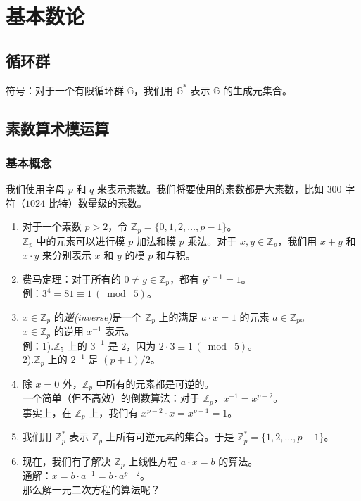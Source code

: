 \chapter{基本数论}\label{chap:A}

\section{循环群}\label{sec:A-1}

符号：对于一个有限循环群 $\mathbb{G}$，我们用 $\mathbb{G}^*$ 表示 $\mathbb{G}$ 的生成元集合。

\section{素数算术模运算}\label{sec:A-2}

\subsection{基本概念}\label{subsec:A-2-1}

我们使用字母 $p$ 和 $q$ 来表示素数。我们将要使用的素数都是大素数，比如 $300$ 字符（$1024$ 比特）数量级的素数。
\begin{enumerate}
	\item 对于一个素数 $p>2$，令 $\mathbb{Z}_p=\{0,1,2,\dots,p-1\}$。\\
	$\mathbb{Z}_p$ 中的元素可以进行模 $p$ 加法和模 $p$ 乘法。对于 $x,y\in\mathbb{Z}_p$，我们用 $x+y$ 和 $x\cdot y$ 来分别表示 $x$ 和 $y$ 的模 $p$ 和与积。
	\item 费马定理：对于所有的 $0\neq g\in\mathbb{Z}_p$，都有 $g^{p-1}=1$。\\
	例：$3^4=81\equiv 1\,(\bmod\;5)$。
	\item $x\in\mathbb{Z}_p$ 的\emph{逆(inverse)}是一个 $\mathbb{Z}_p$ 上的满足 $a\cdot x=1$ 的元素 $a\in\mathbb{Z}_p$。\\
	$x\in\mathbb{Z}_p$ 的逆用 $x^{-1}$ 表示。\\
	例：1).\quad $\mathbb{Z}_5$ 上的 $3^{-1}$ 是 $2$，因为 $2\cdot 3\equiv1\,(\bmod\;5)$。\\
	\hspace*{18pt} 2).\quad $\mathbb{Z}_p$ 上的 $2^{-1}$ 是 $(p+1)/2$。
	\item 除 $x=0$ 外，$\mathbb{Z}_p$ 中所有的元素都是可逆的。\\
	一个简单（但不高效）的倒数算法：对于 $\mathbb{Z}_p$，$x^{-1}=x^{p-2}$。\\
	事实上，在 $\mathbb{Z}_p$ 上，我们有 $x^{p-2}\cdot x=x^{p-1}=1$。
	\item 我们用 $\mathbb{Z}_p^*$ 表示 $\mathbb{Z}_p$ 上所有可逆元素的集合。于是 $\mathbb{Z}_p^*=\{1,2,\dots,p-1\}$。
	\item 现在，我们有了解决 $\mathbb{Z}_p$ 上线性方程 $a\cdot x = b$ 的算法。\\
	通解：$x=b\cdot a^{-1}=b\cdot a^{p-2}$。\\
	那么解一元二次方程的算法呢？
\end{enumerate}

